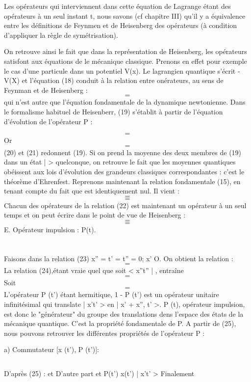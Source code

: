 Les opérateurs qui interviennent dans cette équation de Lagrange
étant des opérateurs à un seul instant t, nous savons (cf chapitre III)
qu'il y a équivalence entre les définitions de Feynmen et de Heisenberg
des opérateurs (à condition d'appliquer la règle de symétrisation).

On retrouve ainsi le fait que dans la représentation de Heisenberg,
les opérateurs satisfont aux équations de le mécanique classique. Prenons en
effet pour exemple le cas d'une particule dans un potentiel V(x). Le lagrangien quantique s'écrit  - V(X) et l'équation (18) conduit à la relation entre onérateurs, au sens de Feynman et de Heisenberg :
\[
\tag{19}=
\]
qui n'est autre que l'équation fondamentale de la dynamique newtonienne.
Dans le formalisme habituel de Heisenberr, (19) s'établit à partir de
l'équation d'évolution de l'opérateur P :

\[
\tag{20}=
\]
Or
\[
\tag{21}=
\]
(20) et (21) redonnent (19).
Si on prend la moyenne des deux membres de (19) dans un état
|  > quelconque, on retrouve le fait que les moyennes quantiques obéissent
aux lois d'évolution des grandeurs classiques correspondantes : c'est le
théorème d'Ehrenfest.
Reprenons maintenant la relation fondamentale (15), en tenant
compte du fait que  est identiquement nul. Il vient :
\[
\tag{22}=
\]
\[
=
\]
Chacun des opérateurs de la relation (22) est maintenant un opérateur à
un seul temps et on peut écrire dans le point de vue de Heisenberg :
\[
\tag{23}=
\]
\[
=
\]
E. Opérateur impulsion : P(t).
\section{}
Faisons dans la relation (23) x'' = t' = t'' = 0; x'  O.
On obtient la relation :
\[
\tag{24}=
\]
La relation (24),étant vraie quel que soit < x''t'' | , entraîne
\[
=
\]
Soit
\[
\tag{25}=
\]
L'opérateur P (t') étant hermitique, 1 -  P (t') est un
opérateur unitaire infinitésimal qui translate | x't' > en | x' + x'', t' >.
P (t), opérateur impulsion, est donc le "générateur" du groupe des translations dens l'espace des états de la mécanique quantique. C'est la propriété
fondamentale de P. A partir de (25), nous pouvons retrouver les différentes
propriétés de l'opérateur P :

a) Commutateur [x (t'), P (t')]:
\subsection{}
D'après (25) :
et
D'autre part
et P(t') x(t') | x't' >
Finalement

